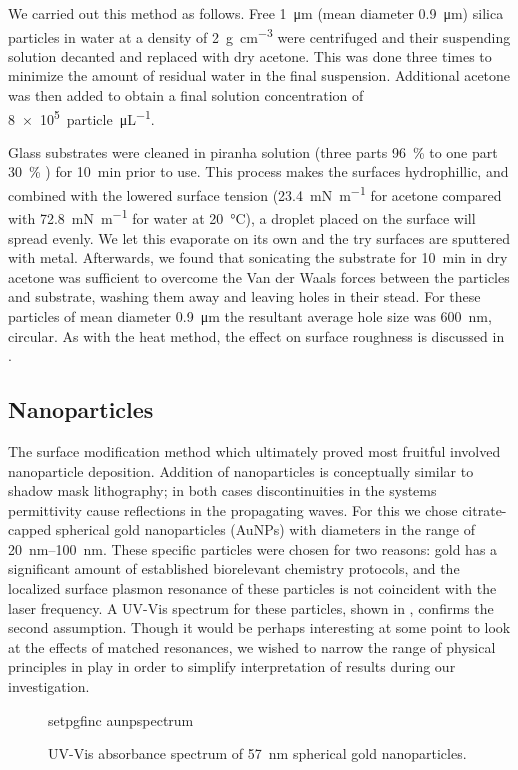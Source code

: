 We carried out this method as follows.  Free \SI{1}{\micro\meter} (mean
diameter \SI{0.9}{\micro\meter}) silica particles in water at a density of
\SI{2}{\gram\per\centi\meter\cubed} were centrifuged and their suspending
solution decanted and replaced with dry acetone.  This was done three times
to minimize the amount of residual water in the final suspension.
Additional acetone was then added to obtain a final solution concentration
of \SI{8e5}{particle\per\micro\liter}.  

Glass substrates were cleaned in piranha solution (three parts
\SI{96}{\percent}  to one part \SI{30}{\percent} ) for
\SI{10}{\minute} prior to use.  This process makes the surfaces
hydrophillic, and combined with the lowered surface tension
(\SI{23.4}{\milli\newton\per\meter} for acetone compared with
\SI{72.8}{\milli\newton\per\meter} for water at \SI{20}{\celsius}), a
droplet placed on the surface will spread evenly.  We let this evaporate on
its own and the try surfaces are sputtered with metal.  Afterwards, we
found that sonicating the substrate for \SI{10}{\minute} in dry acetone was
sufficient to overcome the Van der Waals forces between the particles and
substrate, washing them away and leaving holes in their stead.  For these
particles of mean diameter \SI{0.9}{\micro\meter} the resultant average
hole size was \SI{600}{\nano\meter}, circular.  As with the heat method,
the effect on surface roughness is discussed in
.

\subsection{Nanoparticles}
The surface modification method which ultimately proved most fruitful
involved nanoparticle deposition.  Addition of nanoparticles is
conceptually similar to shadow mask lithography; in both cases
discontinuities in the systems permittivity cause reflections in the
propagating waves.  For this we chose citrate-capped spherical gold
nanoparticles (AuNPs) with diameters in the range of
\SIrange{20}{100}{\nano\meter}.  These specific particles were chosen for
two reasons: gold has a significant amount of established biorelevant
chemistry protocols, and the localized surface plasmon resonance of these
particles is not coincident with the laser frequency.  A UV-Vis spectrum for
these particles, shown in , confirms the second
assumption.  Though it would be perhaps interesting at some point to look
at the effects of matched resonances, we wished to narrow the range of
physical principles in play in order to simplify interpretation of results
during our investigation.
\begin{figure}[ht]
 \centering
 {setpgfinc}
 {aunpspectrum}
 \caption{UV-Vis absorbance spectrum of \SI{57}{\nano\meter} spherical gold
 nanoparticles.}
 \label{fig:aunpspectrum}
\end{figure}

